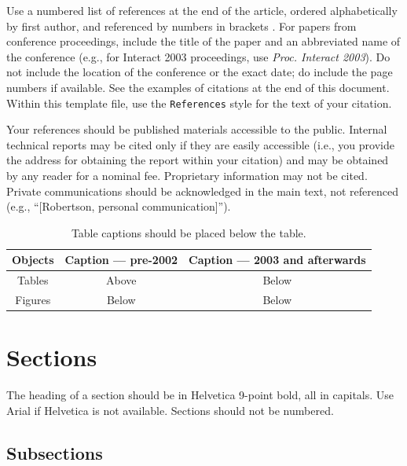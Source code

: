 \documentclass{sigchi-alternate}
\newcommand\tabhead[1]{\small\textbf{#1}}
\begin{document}
Use a numbered list of references at the end of the article, ordered
alphabetically by first author, and referenced by numbers in brackets
\cite{ethics,
  Klemmer:2002:WSC:503376.503378,
  Mather:2000:MUT,
  Zellweger:2001:FAO:504216.504224}. For
papers from conference proceedings, include the title of the paper and
an abbreviated name of the conference (e.g., for Interact 2003
proceedings, use \textit{Proc. Interact 2003}). Do not include the
location of the conference or the exact date; do include the page
numbers if available. See the examples of citations at the end of this
document. Within this template file, use the \texttt{References} style
for the text of your citation.

Your references should be published materials accessible to the
public.  Internal technical reports may be cited only if they are
easily accessible (i.e., you provide the address for obtaining the
report within your citation) and may be obtained by any reader for a
nominal fee.  Proprietary information may not be cited. Private
communications should be acknowledged in the main text, not referenced
(e.g., ``[Robertson, personal communication]'').

\begin{table}
  \centering
  \begin{tabular}{|c|c|c|}
    \hline
    \tabhead{Objects} &
    \multicolumn{1}{|p{0.3\columnwidth}|}{\centering\tabhead{Caption --- pre-2002}} &
    \multicolumn{1}{|p{0.4\columnwidth}|}{\centering\tabhead{Caption --- 2003 and afterwards}} \\
    \hline
    Tables & Above & Below \\
    \hline
    Figures & Below & Below \\
    \hline
  \end{tabular}
  \caption{Table captions should be placed below the table.}
  \label{tab:table1}
\end{table}

\section{Sections}

The heading of a section should be in Helvetica 9-point bold, all in
capitals. Use Arial if Helvetica is not available. Sections should
not be numbered.

\subsection{Subsections}
\end{document}
